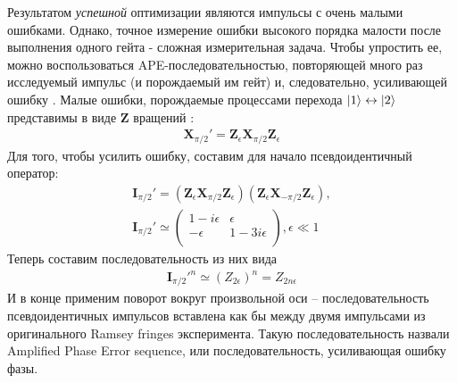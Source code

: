\documentclass[12pt, twoside]{report}
\DeclarePairedDelimiter\ket{\lvert}{\rangle}
\numberwithin{equation}{section}
\numberwithin{figure}{section}
\begin{document}
Результатом \textit{успешной} оптимизации являются импульсы с очень малыми ошибками. Однако, точное измерение ошибки высокого порядка малости после выполнения одного гейта - сложная измерительная задача. Чтобы упростить ее, можно воспользоваться APE-последовательностью, повторяющей много раз исследуемый импульс (и порождаемый им гейт) и, следовательно, усиливающей ошибку \cite{Lucero2010}. Малые ошибки, порождаемые процессами перехода $\ket{1} \leftrightarrow \ket{2}$ представимы в виде $\mathbf{Z}$ вращений  \cite{Steffen2006}:
\begin{gather*}
\mathbf{X}_{\pi/2}' = \mathbf{Z}_\epsilon \mathbf{X}_{\pi/2} \mathbf{Z}_\epsilon
\end{gather*}
Для того, чтобы усилить ошибку, составим для начало псевдоидентичный оператор:
\begin{gather*}
\mathbf{I}_{\pi/2}' = \left( \mathbf{Z}_\epsilon \mathbf{X}_{\pi/2} \mathbf{Z}_\epsilon \right) \left( \mathbf{Z}_\epsilon \mathbf{X}_{-\pi/2} \mathbf{Z}_\epsilon \right),\\
\mathbf{I}_{\pi/2}' \simeq 
\begin{pmatrix}
1 - i\epsilon & \epsilon \\
-\epsilon & 1 -3i\epsilon \\
\end{pmatrix}, \epsilon \ll 1
\end{gather*}
Теперь составим последовательность из них вида
\begin{gather*}
\mathbf{I}_{\pi/2}'^n \simeq \left(Z_{2\epsilon} \right)^n = Z_{2 n \epsilon}
\end{gather*}
И в конце применим поворот вокруг произвольной оси -- последовательность псевдоидентичных импульсов вставлена как бы между двумя импульсами из оригинального Ramsey fringes эксперимента. Такую последовательность назвали Amplified Phase Error sequence, или последовательность, усиливающая ошибку фазы. 
\end{document}
